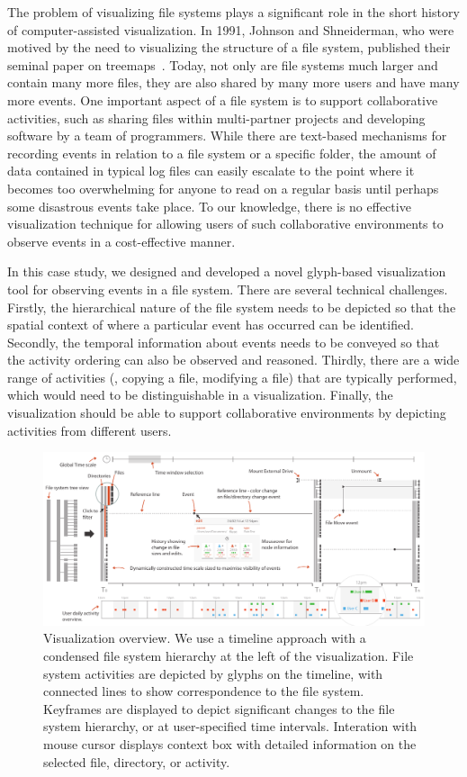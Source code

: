 The problem of visualizing file systems plays a significant role in the short history of computer-assisted visualization.
In 1991, Johnson and Shneiderman, who were motived by the need to visualizing the structure of a file system, published their seminal paper on treemaps~\cite{johnson91}.
Today, not only are file systems much larger and contain many more files, they are also shared by many more users and have many more events.
One important aspect of a file system is to support collaborative activities, such as sharing files within multi-partner projects and developing software by a team of programmers.
While there are text-based mechanisms for recording events in relation to a file system or a specific folder, the amount of data contained in typical log files can easily escalate to the point where it becomes too overwhelming for anyone to read on a regular basis until perhaps some disastrous events take place.
To our knowledge, there is no effective visualization technique for allowing users of such collaborative environments to observe events in a cost-effective manner.

In this case study, we designed and developed a novel glyph-based visualization tool for observing events in a file system.
There are several technical challenges.
Firstly, the hierarchical nature of the file system needs to be depicted so that the spatial context of where a particular event has occurred can be identified.
Secondly, the temporal information about events needs to be conveyed so that the activity ordering can also be observed and reasoned.
Thirdly, there are a wide range of activities (\eg, copying a file, modifying a file) that are typically performed, which would need to be distinguishable in a visualization.
Finally, the visualization should be able to support collaborative environments by depicting activities from different users.

\begin{figure}[h]
\begin{center}
\includegraphics[width=\textwidth]{images/filesystem/system_overview}
\end{center}
\caption{Visualization overview. We use a timeline approach with a condensed file system hierarchy at the left of the visualization. File system activities are depicted by glyphs on the timeline, with connected lines to show correspondence to the file system. Keyframes are displayed to depict significant changes to the file system hierarchy, or at user-specified time intervals. Interation with mouse cursor displays context box with detailed information on the selected file, directory, or activity.}
\label{fig:system}
\end{figure}

